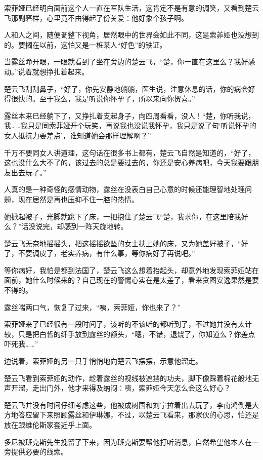 索菲娅已经明白面前这个人一直在军队生活，这肯定不是有意的调笑，又看到楚云飞那副窘样，心里竟不由得起了份关爱：他好象个孩子啊。

人和人之间，随便调整下视角，居然眼中的世界会如此不同，这是索菲娅也没想到的。要搁在以前，这怕又是一桩某人“好色”的铁证。

当露丝睁开眼，一眼就看到了坐在旁边的楚云飞，“楚，你一直在这里么？我好感动。”说着就想挣扎着起来。

楚云飞刮刮鼻子，“好了，你先安静地躺躺，医生说，注意休息的话，你的病会好得很快的。至于我么，我是听说你怀孕了，所以来向你贺喜。”

露丝本来已经躺下了，又挣扎着支起身子，向四周看看，没人！“楚，你听我说，我……我只是同索菲娅开个玩笑，再说我也没说我怀孕，我只是说了句‘听说怀孕的女人抵抗力要差点’，谁知道她会那样理解啊？”

千万不要同女人讲道理，这句话在很多书上都有，楚云飞自然是知道的，“好了，这也没什么大不了的，该过去的总是要过去的，你还是安心养病吧，今天我要跟朋友出去玩了。”

人真的是一种奇怪的感情动物，露丝在没表白自己心意的时候还能理智地处理问题，现在居然是再也压抑不住一腔的热情。

她掀起被子，光脚就跳下了床，一把抱住了楚云飞“楚，我求你，在这里陪我好么？”话没说完，却感到一阵天旋地转。

楚云飞无奈地摇摇头，把这摇摇欲坠的女士扶上她的床，又为她盖好被子，“好了，不要调皮了，老实养病，有什么事，等你病好了再说吧。”

等你病好，我怕是都到法国了，楚云飞这么想着抬起头，却意外地发现索菲娅站在面前，她什么时候来的？自己现在的警惕心实在是太差了，看来贪图安逸果然是要不得的。

露丝喘两口气，恢复了过来，“咦，索菲娅，你也来了？”

索菲娅来了已经很有一段时间了，该听的不该听的都听到了，不过她并没有太计较，只是把白皙的纤手放到露丝的额头，“嗯，不错，退烧了，你知道么？你差点吓死我……”

边说着，索菲娅的另一只手悄悄地向楚云飞摆摆，示意他溜走。

楚云飞看到索菲娅的动作，趁着露丝的视线被遮挡的功夫，脚下像踩着棉花般地无声开溜，走出门外，他才来得及纳闷：咦，索菲娅今天怎么会这么好心？

楚云飞并没有时间仔细考虑这些，他被成树国和刘宁拉着出去玩了，李南鸿倒是大方地答应留下来照顾露丝和伊琳娜，不过，以楚云飞看来，那家伙的心思，怕还是放在跟维伦斯家套近乎上面。

多尼被班克斯先生挽留了下来，因为班克斯要帮他打听消息，自然希望他本人在一旁提供必要的线索。

